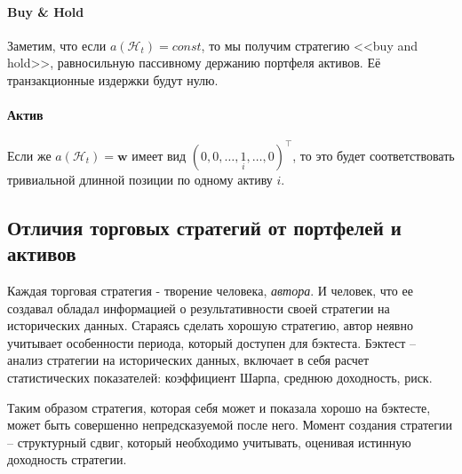 \paragraph{Buy \& Hold}
Заметим, что если $a(\mathcal{H}_t) = const$, то мы получим стратегию <<buy and hold>>, равносильную пассивному держанию портфеля активов. Её транзакционные издержки будут нулю.
\paragraph{Актив}
Если же $a(\mathcal{H}_t)=\textbf{w}$ имеет вид $(0, 0, \dots, \underset{i}{1}, \dots, 0)^\top$, то это будет соответствовать тривиальной длинной позиции по одному активу $i$.
\subsection{Отличия торговых стратегий от портфелей и активов}
Каждая торговая стратегия - творение человека, \textit{автора}. 
И человек, что ее создавал обладал информацией о результативности своей стратегии на исторических данных.
Стараясь сделать хорошую стратегию, автор неявно учитывает особенности периода, который доступен для бэктеста.
Бэктест -- анализ стратегии на исторических данных, включает в себя расчет статистических показателей: коэффициент Шарпа, среднюю доходность, риск.

Таким образом стратегия, которая себя может и показала хорошо на бэктесте, может быть совершенно непредсказуемой после него.
Момент создания стратегии -- структурный сдвиг, который необходимо учитывать, оценивая истинную доходность стратегии.


